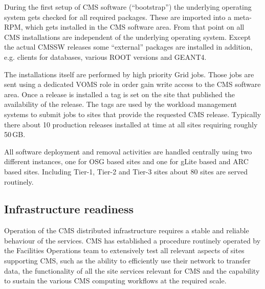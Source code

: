 During the
first setup of CMS software (``bootstrap'') the underlying operating system gets
checked for all required packages. These are imported into a meta-RPM,
which gets installed in the CMS software area. From that point on all
CMS installations are independent of the underlying operating
system. Except the actual CMSSW releases some ``external'' packages
are installed in addition, e.g. clients for databases, various ROOT
versions and GEANT4.

The installations itself are performed by high priority Grid
jobs. Those jobs are sent using a dedicated VOMS role %
in order gain write access to the CMS software area. Once a release is
installed a tag is set on the %
site that published the availability of
the release. The tags are used by the workload management systems to
submit jobs to sites that provide the requested CMS release.
Typically there about 10 production releases installed at time at all
sites requiring roughly 50\,GB.

All software deployment and  removal activities are handled centrally
using two different instances, one for OSG based sites and one for
gLite based and ARC based sites. Including Tier-1, Tier-2 and Tier-3
sites about 80 sites are served routinely.

\subsection{Infrastructure readiness}
\label{sec:4_2}
Operation of the CMS distributed infrastructure requires a stable and 
reliable behaviour of the services.
CMS has established a procedure routinely operated by the Facilities 
Operations team to extensively test all relevant aspects of sites 
supporting CMS, such as the ability to efficiently use their network 
to transfer data, the functionality of all the site services relevant for CMS and the capability to sustain the various CMS computing workflows at the required scale.

